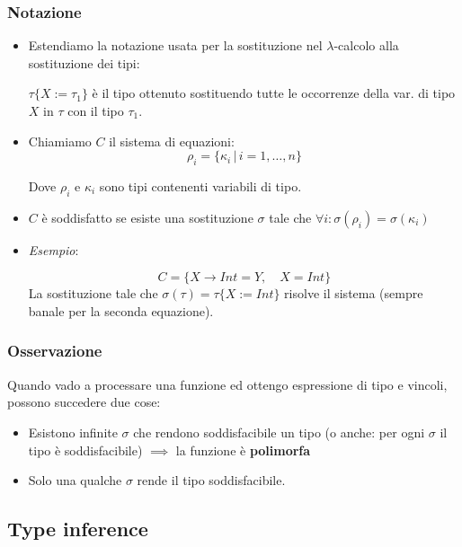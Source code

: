 \documentclass[a4paper,10pt]{article}
\begin{document}
\subsubsection{Notazione}
\begin{itemize}
 \item Estendiamo la notazione usata per la sostituzione nel $\lambda$-calcolo alla sostituzione dei tipi:\smallskip

$\tau\{X := \tau_1\}$ è il tipo ottenuto sostituendo tutte le occorrenze della var. di tipo $X$ in $\tau$ con il tipo $\tau_1$.
 \item Chiamiamo $C$ il sistema di equazioni:
 \[ \rho_i = \{\kappa_i \,|\, i = 1, \hdots, n\} \]

 Dove $\rho_i$ e $\kappa_i$ sono tipi contenenti variabili di tipo. 
 \item $C$ è soddisfatto se esiste una sostituzione $\sigma$ tale che $\forall i: \sigma(\rho_i) = \sigma(\kappa_i)$
 \item \emph{Esempio}: 
 
 \[C = \{ X \to Int = Y, \quad X = Int\}\]
 La sostituzione tale che $\sigma(\tau) = \tau\{X := Int\}$ risolve il sistema (sempre banale per la seconda equazione).
\end{itemize}

\subsubsection{Osservazione}

Quando vado a processare una funzione ed ottengo espressione di tipo e vincoli, possono succedere due cose:

\begin{itemize}
 \item Esistono infinite $\sigma$ che rendono soddisfacibile un tipo (o anche: per ogni $\sigma$ il tipo è soddisfacibile) $\implies$ la funzione è \textbf{polimorfa}
 \item Solo una qualche $\sigma$ rende il tipo soddisfacibile.
\end{itemize}

\newpage
 \subsection{Type inference}
\end{document}
